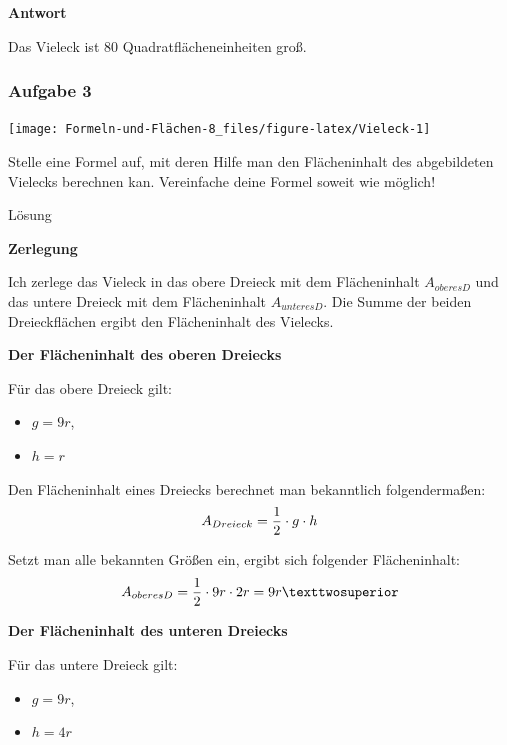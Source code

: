 \documentclass[
  ngerman,
]{book}
\providecommand{\tightlist}{%
  \setlength{\itemsep}{0pt}\setlength{\parskip}{0pt}}
\begin{document}
\textbf{Antwort}

Das Vieleck ist \(80\) Quadratflächeneinheiten groß.

\hypertarget{section-16}{%
\subsubsection*{}\label{section-16}}

\hypertarget{aufgabe-3-4}{%
\subsubsection*{Aufgabe 3}\label{aufgabe-3-4}}

\begin{center}\texttt{[image: Formeln-und-Flächen-8\_files/figure-latex/Vieleck-1]} \end{center}

Stelle eine Formel auf, mit deren Hilfe man den Flächeninhalt des abgebildeten Vielecks berechnen kan. Vereinfache deine Formel soweit wie möglich!

Lösung

\textbf{Zerlegung}

Ich zerlege das Vieleck in das obere Dreieck mit dem Flächeninhalt \(A_{oberesD}\) und das untere Dreieck mit dem Flächeninhalt \(A_{unteresD}\). Die Summe der beiden Dreieckflächen ergibt den Flächeninhalt des Vielecks.

\textbf{Der Flächeninhalt des oberen Dreiecks}

Für das obere Dreieck gilt:

\begin{itemize}
\tightlist
\item
  \(g= 9r\),
\item
  \(h = r\)
\end{itemize}

Den Flächeninhalt eines Dreiecks berechnet man bekanntlich folgendermaßen:
\[A_{Dreieck} = {1 \over 2} \cdot g \cdot h\]

Setzt man alle bekannten Größen ein, ergibt sich folgender Flächeninhalt:
\[ A_{oberesD} = {1 \over 2} \cdot 9r \cdot 2r = 9r²\]

\textbf{Der Flächeninhalt des unteren Dreiecks}

Für das untere Dreieck gilt:

\begin{itemize}
\tightlist
\item
  \(g= 9r\),
\item
  \(h =4r\)
\end{itemize}
\end{document}
